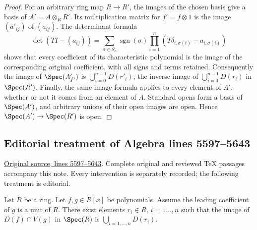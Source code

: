 \begin{proof}
\medskip\noindent
For an arbitrary ring map $R\to R'$, the images of the chosen basis
give a basis of $A'=A\otimes_RR'$. Its multiplication matrix for
$f'=f\otimes1$ is the image $(a'_{ij})$ of $(a_{ij})$. The determinant
formula
$$
\det(TI-(a_{ij}))=
\sum_{\sigma\in S_n}\operatorname{sgn}(\sigma)
\prod_{i=1}^n(T\delta_{i,\sigma(i)}-a_{i,\sigma(i)})
$$
shows that every coefficient of its characteristic polynomial is the
image of the corresponding original coefficient, with all signs and
terms retained. Consequently the image of $\Spec(A'_{f'})$ is
$\bigcup_{i=0}^{n-1}D(r'_i)$, the inverse image of
$\bigcup_{i=0}^{n-1}D(r_i)$ in $\Spec(R')$.
Finally, the same image formula applies to every element of $A'$,
whether or not it comes from an element of $A$. Standard opens form
a basis of $\Spec(A')$, and arbitrary unions of their open images
are open. Hence $\Spec(A')\to\Spec(R')$ is open.
\end{proof}


\subsection{Editorial treatment of Algebra lines 5597--5643}

\hypertarget{algebra-context-037}{}

\noindent\href{https://github.com/stacks/stacks-project/blob/a04446e57ec1fbc252a871afcec7752fb2807b14/algebra.tex\#L5597}{Original source, lines 5597--5643}. Complete original and reviewed TeX passages accompany this note. Every intervention is separately recorded; the following treatment is editorial.


\begin{lemma}
\label{editorial-source-lemma-affineline-special}
Let $R$ be a ring. Let $f, g \in R[x]$ be polynomials.
Assume the leading coefficient of $g$ is a unit of $R$.
There exist elements $r_i\in R$, $i = 1\ldots, n$ such that
the image of $D(f) \cap V(g)$ in $\Spec(R)$ is
$\bigcup_{i = 1, \ldots, n} D(r_i)$.
\end{lemma}


